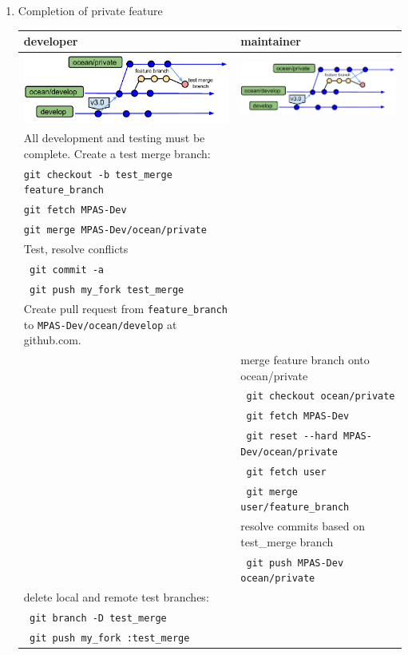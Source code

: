 \documentclass[11pt]{article}
\begin{document}
\begin{enumerate}
\clearpage
\item Completion of private feature

\begin{centering}
\end{centering}
 \begin{tabular}[c]{L{3.3in}|L{3.3in}}
developer & maintainer \\
\hline
\includegraphics[width=3.25in]{f/MPASworkflow_4d.pdf} & \includegraphics[width=3.25in]{f/MPASworkflow_4.pdf} \\
All development and testing must be complete.
Create a test merge branch: \\
\verb|git checkout -b test_merge feature_branch|  \\
\verb|git fetch MPAS-Dev| \\
\verb|git merge MPAS-Dev/ocean/private|  \\
Test, resolve conflicts \\
\verb| git commit -a|  \\
\verb| git push my_fork test_merge| \\
Create pull request from \verb|feature_branch| to \verb|MPAS-Dev/ocean/develop| at github.com. \\
& merge feature branch onto ocean/private \\
& \verb| git checkout ocean/private| \\
& \verb| git fetch MPAS-Dev| \\
& \verb| git reset --hard MPAS-Dev/ocean/private | \\
& \verb| git fetch user| \\
& \verb| git merge user/feature_branch| \\
& resolve commits based on test\_merge branch \\
& \verb| git push MPAS-Dev ocean/private| \\
delete local and remote test branches: \\
\verb| git branch -D test_merge|  \\
\verb| git push my_fork :test_merge| \\
 \end{tabular}


\end{enumerate}
\end{document}
